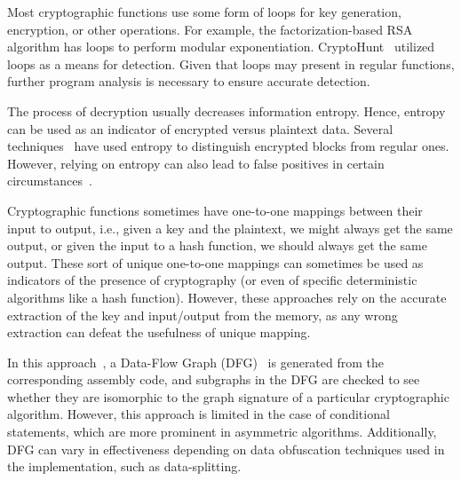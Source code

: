  Most cryptographic functions use some form of loops for key generation, encryption, or other operations.
For example, the factorization-based RSA algorithm has loops to perform modular exponentiation.
CryptoHunt~\cite{xu2017cryptographic} utilized loops as a means for detection. Given that loops may present in regular functions, further program analysis is necessary to ensure accurate detection.

 The process of decryption usually decreases information entropy. Hence, entropy can be used as an indicator of  encrypted versus plaintext data. Several techniques~\cite{lutz2008towards, lee2022rcryptect} have used entropy to distinguish encrypted blocks from regular ones. 
However, relying on entropy can also lead to false positives in certain circumstances~\cite{grobert2011automated}.

 Cryptographic functions sometimes have one-to-one mappings between their input to output, i.e., given a key and the plaintext, we might always get the same output, or given the input to a hash function, we should always get the same output. 
These sort of unique one-to-one mappings can sometimes be used as indicators of the presence of cryptography (or even of specific deterministic algorithms like a hash function). 
However, these approaches rely on the accurate extraction of the key and input/output from the memory, as any wrong extraction can defeat the usefulness of unique mapping.
 
In this approach~\cite{lestringant2015automated}, a Data-Flow Graph (DFG)~\cite{DFG} is generated from the
corresponding assembly code, and subgraphs in the DFG are checked to see
whether they are isomorphic to the graph signature of a particular cryptographic
algorithm.
However, this approach is limited in the case of conditional
statements, which are more prominent in asymmetric algorithms. Additionally, DFG can
vary in effectiveness depending on data obfuscation techniques used in the implementation, such as data-splitting.

